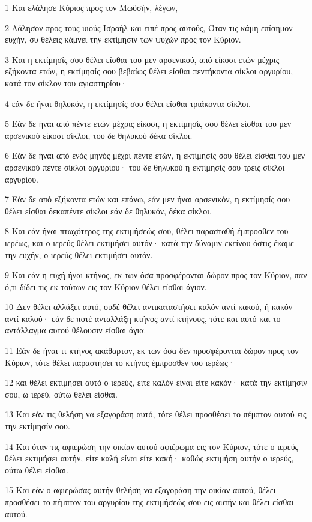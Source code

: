 \par 1 Και ελάλησε Κύριος προς τον Μωϋσήν, λέγων,
\par 2 Λάλησον προς τους υιούς Ισραήλ και ειπέ προς αυτούς, Όταν τις κάμη επίσημον ευχήν, συ θέλεις κάμνει την εκτίμησιν των ψυχών προς τον Κύριον.
\par 3 Και η εκτίμησίς σου θέλει είσθαι του μεν αρσενικού, από είκοσι ετών μέχρις εξήκοντα ετών, η εκτίμησίς σου βεβαίως θέλει είσθαι πεντήκοντα σίκλοι αργυρίου, κατά τον σίκλον του αγιαστηρίου·
\par 4 εάν δε ήναι θηλυκόν, η εκτίμησίς σου θέλει είσθαι τριάκοντα σίκλοι.
\par 5 Εάν δε ήναι από πέντε ετών μέχρις είκοσι, η εκτίμησίς σου θέλει είσθαι του μεν αρσενικού είκοσι σίκλοι, του δε θηλυκού δέκα σίκλοι.
\par 6 Εάν δε ήναι από ενός μηνός μέχρι πέντε ετών, η εκτίμησίς σου θέλει είσθαι του μεν αρσενικού πέντε σίκλοι αργυρίου· του δε θηλυκού η εκτίμησίς σου τρεις σίκλοι αργυρίου.
\par 7 Εάν δε από εξήκοντα ετών και επάνω, εάν μεν ήναι αρσενικόν, η εκτίμησίς σου θέλει είσθαι δεκαπέντε σίκλοι εάν δε θηλυκόν, δέκα σίκλοι.
\par 8 Και εάν ήναι πτωχότερος της εκτιμήσεώς σου, θέλει παρασταθή έμπροσθεν του ιερέως, και ο ιερεύς θέλει εκτιμήσει αυτόν· κατά την δύναμιν εκείνου όστις έκαμε την ευχήν, ο ιερεύς θέλει εκτιμήσει αυτόν.
\par 9 Και εάν η ευχή ήναι κτήνος, εκ των όσα προσφέρονται δώρον προς τον Κύριον, παν ό,τι δίδει τις εκ τούτων εις τον Κύριον θέλει είσθαι άγιον.
\par 10 Δεν θέλει αλλάξει αυτό, ουδέ θέλει αντικαταστήσει καλόν αντί κακού, ή κακόν αντί καλού· εάν δε ποτέ ανταλλάξη κτήνος αντί κτήνους, τότε και αυτό και το αντάλλαγμα αυτού θέλουσιν είσθαι άγια.
\par 11 Εάν δε ήναι τι κτήνος ακάθαρτον, εκ των όσα δεν προσφέρονται δώρον προς τον Κύριον, τότε θέλει παραστήσει το κτήνος έμπροσθεν του ιερέως·
\par 12 και θέλει εκτιμήσει αυτό ο ιερεύς, είτε καλόν είναι είτε κακόν· κατά την εκτίμησίν σου, ω ιερεύ, ούτω θέλει είσθαι.
\par 13 Και εάν τις θελήση να εξαγοράση αυτό, τότε θέλει προσθέσει το πέμπτον αυτού εις την εκτίμησίν σου.
\par 14 Και όταν τις αφιερώση την οικίαν αυτού αφιέρωμα εις τον Κύριον, τότε ο ιερεύς θέλει εκτιμήσει αυτήν, είτε καλή είναι είτε κακή· καθώς εκτιμήση αυτήν ο ιερεύς, ούτω θέλει είσθαι.
\par 15 Και εάν ο αφιερώσας αυτήν θελήση να εξαγοράση την οικίαν αυτού, θέλει προσθέσει το πέμπτον του αργυρίου της εκτιμήσεώς σου εις αυτήν και θέλει είσθαι αυτού.
